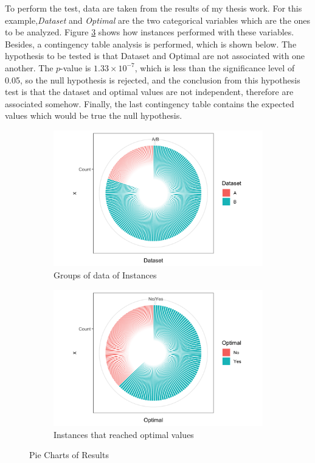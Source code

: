 \documentclass[10pt,leter,openany]{article}
\begin{document}
To perform the test, data are taken from the results of my thesis work. For this example,\textit{Dataset} and \textit{Optimal} are the two categorical variables which are the ones to be analyzed. Figure \ref{fig:pies} shows how instances performed with these variables. Besides, a contingency table analysis is performed, which is shown below. The hypothesis to be tested is that Dataset and Optimal are not associated with one another. The $p$-value is $1.33 \times 10^{-7}$, which is less than the significance level of 0.05, so the null hypothesis is rejected, and the conclusion from this hypothesis test is that the dataset and optimal values are not independent, therefore are associated somehow. Finally, the last contingency table contains the expected values which would be true the null hypothesis.
		 \begin{figure}
			\centering
			\begin{subfigure}[b]{0.475\textwidth}
				\centering
				\includegraphics[width=\textwidth]{extras/pie_dataset}
				\caption[]%
				{{\small Groups of data of Instances}}    
				\label{fig:pie_dataset}
			\end{subfigure}
			\hfill
			\begin{subfigure}[b]{0.475\textwidth}  
				\centering 
				\includegraphics[width=\textwidth]{extras/pie_optimal}
				\caption[]%
				{{\small Instances that reached optimal values}}    
				\label{fig:pie:optimal}
			\end{subfigure}
			\hfill
			\caption[ ]
			{\small Pie Charts of Results} 
			\label{fig:pies}
		\end{figure}
	
\end{document}
